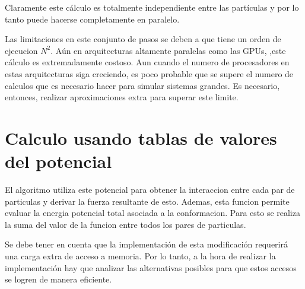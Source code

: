 Claramente este cálculo es totalmente independiente entre las partículas y por lo tanto puede hacerse completamente en paralelo.





Las limitaciones en este conjunto de pasos se deben a que tiene un orden de ejecucion $N^2$. Aún en arquitecturas altamente paralelas como las GPUs, ,este cálculo es extremadamente costoso. 
Aun cuando el numero de procesadores en estas arquitecturas siga creciendo, es poco probable que se supere el numero de calculos que es necesario hacer para simular sistemas grandes.
Es necesario, entonces, realizar aproximaciones extra para superar este limite.




\section{Calculo usando tablas de valores del potencial }

El algoritmo utiliza este potencial para obtener la interaccion entre cada par de particulas y derivar la fuerza resultante de esto. 
Ademas, esta funcion permite evaluar la energia potencial total asociada a la conformacion. Para esto se realiza la suma del valor de la funcion entre todos los pares de particulas.

Se debe tener en cuenta que la implementación de esta modificación requerirá una carga extra de acceso a memoria. 
Por lo tanto, a la hora de realizar la implementación hay que analizar las alternativas posibles para que estos accesos se logren de manera eficiente.
 


% 


